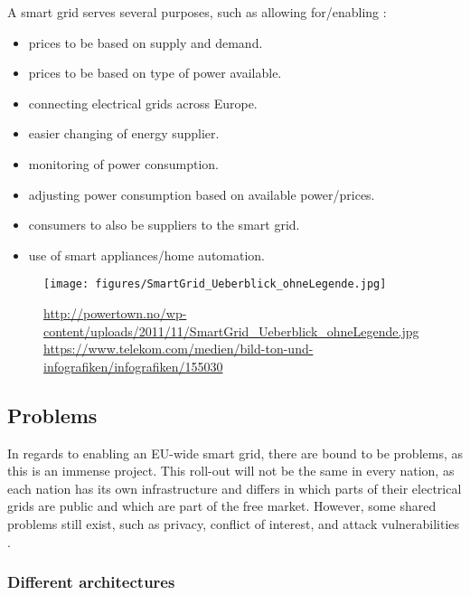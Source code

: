 A smart grid serves several purposes, such as allowing for/enabling \cite{smartgrid_gov} \cite{directive_2009_72_EC}:
\begin{itemize}
	\item prices to be based on supply and demand.
	\item prices to be based on type of power available.
	\item connecting electrical grids across Europe.
	\item easier changing of energy supplier.
	\item monitoring of power consumption.
	\item adjusting power consumption based on available power/prices.
	\item consumers to also be suppliers to the smart grid.
	\item use of smart appliances/home automation.
\end{itemize}

\begin{figure}
	\texttt{[image: figures/SmartGrid\_Ueberblick\_ohneLegende.jpg]}
	\caption{\url{http://powertown.no/wp-content/uploads/2011/11/SmartGrid_Ueberblick_ohneLegende.jpg} \url{https://www.telekom.com/medien/bild-ton-und-infografiken/infografiken/155030}
	}
	\label{fig:background:smartgrid}
\end{figure}

\subsection{Problems}
In regards to enabling an EU-wide smart grid, there are bound to be problems, as this is an immense project.
This roll-out will not be the same in every nation, as each nation has its own infrastructure and differs in which parts of their electrical grids are public and which are part of the free market.
However, some shared problems still exist, such as privacy, conflict of interest, and attack vulnerabilities \cite{offswitch} \cite{smart_meter_survey} \cite{security_economics}.

\subsubsection{Different architectures}

